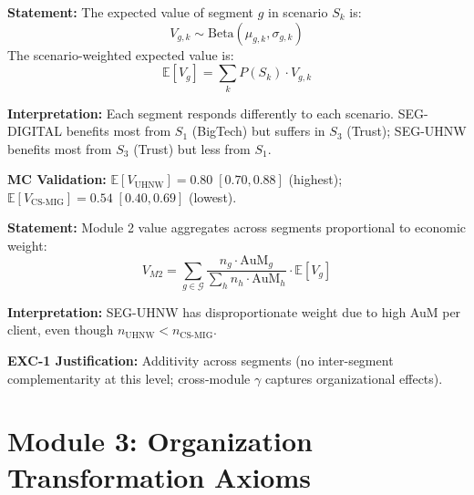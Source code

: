 \begin{tcolorbox}[colback=gray!5!white, colframe=gray!75!black,
    title=Axiom AIM-9: Scenario-Segment Value Interaction]
\label{ax:aim-9}

\textbf{Statement:}
The expected value of segment $g$ in scenario $S_k$ is:
\begin{equation}
V_{g,k} \sim \text{Beta}(\mu_{g,k}, \sigma_{g,k})
\label{eq:aim-segment-scenario}
\end{equation}
The scenario-weighted expected value is:
\begin{equation}
\mathbb{E}[V_g] = \sum_{k} P(S_k) \cdot V_{g,k}
\label{eq:aim-expected-value}
\end{equation}

\textbf{Interpretation:} Each segment responds differently to each scenario.
SEG-DIGITAL benefits most from $S_1$ (BigTech) but suffers in $S_3$ (Trust);
SEG-UHNW benefits most from $S_3$ (Trust) but less from $S_1$.

\textbf{MC Validation:}
$\mathbb{E}[V_{\text{UHNW}}] = 0.80 \; [0.70, 0.88]$ (highest);
$\mathbb{E}[V_{\text{CS-MIG}}] = 0.54 \; [0.40, 0.69]$ (lowest).
\end{tcolorbox}


\begin{tcolorbox}[colback=gray!5!white, colframe=gray!75!black,
    title=Axiom AIM-10: Segment-Weighted Module 2 Value]
\label{ax:aim-10}

\textbf{Statement:}
Module 2 value aggregates across segments proportional to economic weight:
\begin{equation}
V_{M2} = \sum_{g \in \mathcal{G}} \frac{n_g \cdot \text{AuM}_g}{\sum_h n_h \cdot \text{AuM}_h} \cdot \mathbb{E}[V_g]
\label{eq:aim-m2-total}
\end{equation}

\textbf{Interpretation:} SEG-UHNW has disproportionate weight due to high
AuM per client, even though $n_{\text{UHNW}} < n_{\text{CS-MIG}}$.

\textbf{EXC-1 Justification:} Additivity across segments (no inter-segment
complementarity at this level; cross-module $\gamma$ captures organizational effects).
\end{tcolorbox}


\section{Module 3: Organization Transformation Axioms}
\label{sec:aim-m3}

